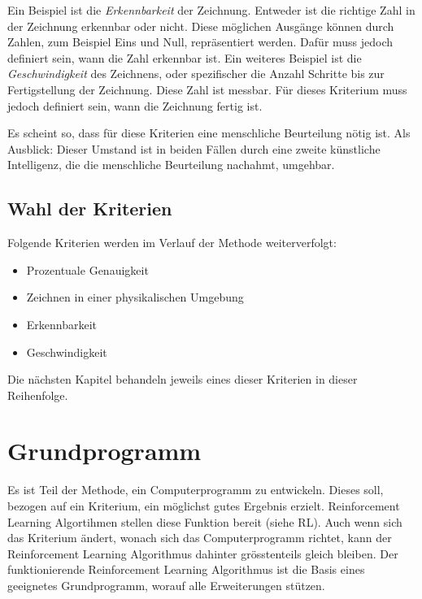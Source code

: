 Ein Beispiel ist die \emph{Erkennbarkeit} der Zeichnung. Entweder ist die
richtige Zahl in der Zeichnung erkennbar oder nicht. Diese möglichen Ausgänge
können durch Zahlen, zum Beispiel Eins und Null, repräsentiert werden. Dafür
muss jedoch definiert sein, wann die Zahl erkennbar ist. 
Ein weiteres Beispiel ist die \emph{Geschwindigkeit} des Zeichnens, oder
spezifischer die Anzahl Schritte bis zur Fertigstellung der Zeichnung. Diese
Zahl ist messbar. Für dieses Kriterium muss jedoch definiert sein, wann die
Zeichnung fertig ist.

Es scheint so, dass für diese Kriterien eine menschliche Beurteilung nötig ist.
Als Ausblick: Dieser Umstand ist in beiden Fällen durch eine zweite
künstliche Intelligenz, die die menschliche Beurteilung nachahmt, umgehbar.


\subsection*{Wahl der Kriterien}
Folgende Kriterien werden im Verlauf der Methode weiterverfolgt:

\begin{itemize}
  \item Prozentuale Genauigkeit
  \item Zeichnen in einer physikalischen Umgebung
  \item Erkennbarkeit 
  \item Geschwindigkeit
\end{itemize}

Die nächsten Kapitel behandeln jeweils eines dieser Kriterien in dieser Reihenfolge.


\section{Grundprogramm}
\label{chap:m_grundprogramm}
Es ist Teil der Methode, ein Computerprogramm zu entwickeln. Dieses soll,
bezogen auf ein Kriterium, ein möglichst gutes Ergebnis erzielt. Reinforcement
Learning Algortihmen stellen diese Funktion bereit (siehe RL). Auch wenn sich  %
das Kriterium ändert, wonach sich das Computerprogramm richtet, kann der
Reinforcement Learning Algorithmus dahinter grösstenteils gleich bleiben. Der
funktionierende Reinforcement Learning Algorithmus ist die Basis eines geeignetes
Grundprogramm, worauf alle Erweiterungen stützen. 

